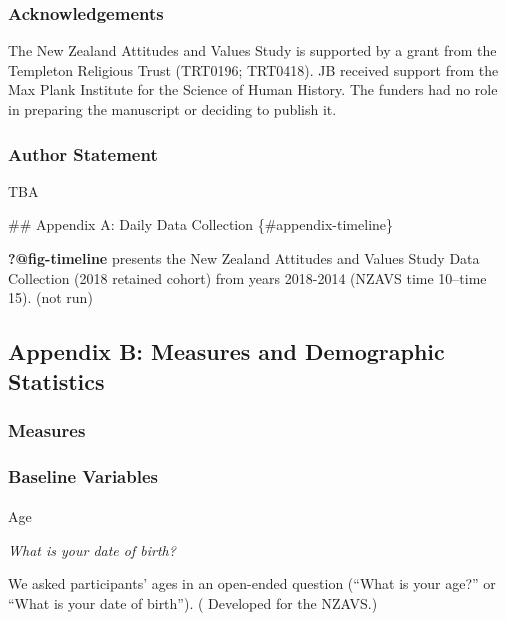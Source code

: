\documentclass[
  single column]{article}
\makeatletter
\let\oldparagraph\paragraph
\renewcommand{\paragraph}{
    \@ifstar
      \xxxParagraphStar
      \xxxParagraphNoStar
  }
\newcommand{\xxxParagraphStar}[1]{\oldparagraph*{#1}\mbox{}}
\newcommand{\xxxParagraphNoStar}[1]{\oldparagraph{#1}\mbox{}}
\makeatother
\begin{document}
\subsubsection{Acknowledgements}\label{acknowledgements}

The New Zealand Attitudes and Values Study is supported by a grant from
the Templeton Religious Trust (TRT0196; TRT0418). JB received support
from the Max Plank Institute for the Science of Human History. The
funders had no role in preparing the manuscript or deciding to publish
it.

\subsubsection{Author Statement}\label{author-statement}

TBA

\newpage{} \#\# Appendix A: Daily Data Collection
\{\#appendix-timeline\}

\newpage{}

\textbf{?@fig-timeline} presents the New Zealand Attitudes and Values
Study Data Collection (2018 retained cohort) from years 2018-2014 (NZAVS
time 10--time 15). (not run)

\newpage{}

\subsection{Appendix B: Measures and Demographic
Statistics}\label{appendix-baseline}

\subsubsection{Measures}\label{measures}

\subsubsection{Baseline Variables}\label{baseline-variables}

\paragraph{Age}\label{age}

\emph{What is your date of birth?}

We asked participants' ages in an open-ended question (``What is your
age?'' or ``What is your date of birth'').
( Developed for the
NZAVS.)
\end{document}
